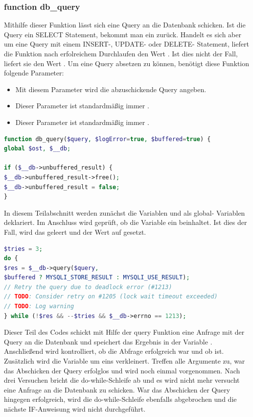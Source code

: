 \subsubsection{function db\_query}

Mithilfe dieser Funktion lässt sich eine Query an die Datenbank schicken. Ist die Query ein SELECT Statement, bekommt man ein  zurück. Handelt es sich aber um eine Query mit einem INSERT-, UPDATE- oder DELETE- Statement, liefert die Funktion nach erfolreichem Durchlaufen den Wert . Ist dies nicht der Fall, liefert sie den Wert . Um eine Query absetzen zu können, benötigt diese Funktion folgende Parameter:
\begin{itemize}
	\item {} Mit diesem Parameter wird die abzuschickende Query angeben.
	\item {} Dieser Parameter ist standardmäßig immer .
	\item {} Dieser Parameter ist standardmäßig immer .
\end{itemize}

\begin{lstlisting}[language=PHP, caption=mysqli.php/function-db\_query1, firstnumber=154]
function db_query($query, $logError=true, $buffered=true) {
global $ost, $__db;

if ($__db->unbuffered_result) {
$__db->unbuffered_result->free();
$__db->unbuffered_result = false;
}
\end{lstlisting}

In diesem Teilabschnitt werden zunächst die Variablen  und  als global- Variablen deklariert.
Im Anschluss wird geprüft, ob die Variable  ein  beinhaltet. Ist dies der Fall, wird das  geleert und der Wert auf  gesetzt.

\newpage
\begin{lstlisting}[language=PHP, caption=mysqli.php/function-db\_query2, firstnumber=163]
$tries = 3;
do {
$res = $__db->query($query,
$buffered ? MYSQLI_STORE_RESULT : MYSQLI_USE_RESULT);
// Retry the query due to deadlock error (#1213)
// TODO: Consider retry on #1205 (lock wait timeout exceeded)
// TODO: Log warning
} while (!$res && --$tries && $__db->errno == 1213);
\end{lstlisting}

Dieser Teil des Codes schickt mit Hilfe der query Funktion eine Anfrage mit der Query an die Datenbank und speichert das Ergebnis in der Variable . Anschließend wird kontrolliert, ob die Abfrage erfolgreich war und ob  ist. Zusätzlich wird die Variable  um eins verkleinert. Treffen alle Argumente zu, war das Abschicken der Query erfolglos und wird noch einmal vorgenommen. Nach drei Versuchen bricht die do-while-Schleife ab und es wird nicht mehr versucht eine Anfrage an die Datenbank zu schicken.
War das Abschicken der Query hingegen erfolgreich, wird die do-while-Schleife ebenfalls abgebrochen und die nächste IF-Anweisung wird nicht durchgeführt.  
\newpage

